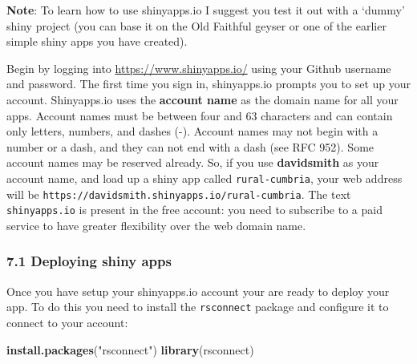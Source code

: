 \documentclass[]{article}
\newenvironment{Shaded}{\begin{snugshade}}{\end{snugshade}}
\newcommand{\KeywordTok}[1]{\textcolor[rgb]{0.13,0.29,0.53}{\textbf{#1}}}
\newcommand{\StringTok}[1]{\textcolor[rgb]{0.31,0.60,0.02}{#1}}
\newcommand{\NormalTok}[1]{#1}
\begin{document}
\textbf{Note}: To learn how to use shinyapps.io I suggest you test it
out with a `dummy' shiny project (you can base it on the Old Faithful
geyser or one of the earlier simple shiny apps you have created).

Begin by logging into \url{https://www.shinyapps.io/} using your Github
username and password. The first time you sign in, shinyapps.io prompts
you to set up your account. Shinyapps.io uses the \textbf{account name}
as the domain name for all your apps. Account names must be between four
and 63 characters and can contain only letters, numbers, and dashes (-).
Account names may not begin with a number or a dash, and they can not
end with a dash (see RFC 952). Some account names may be reserved
already. So, if you use \textbf{davidsmith} as your account name, and
load up a shiny app called \texttt{rural-cumbria}, your web address will
be \texttt{https://davidsmith.shinyapps.io/rural-cumbria}. The text
\texttt{shinyapps.io} is present in the free account: you need to
subscribe to a paid service to have greater flexibility over the web
domain name.

\subsubsection{7.1 Deploying shiny apps}\label{deploying-shiny-apps}

Once you have setup your shinyapps.io account your are ready to deploy
your app. To do this you need to install the \texttt{rsconnect} package
and configure it to connect to your account:

\begin{Shaded}
\begin{Highlighting}[]
\KeywordTok{install.packages}\NormalTok{(}\StringTok{"rsconnect"}\NormalTok{)}
\KeywordTok{library}\NormalTok{(rsconnect)}
\end{Highlighting}
\end{Shaded}
\end{document}
